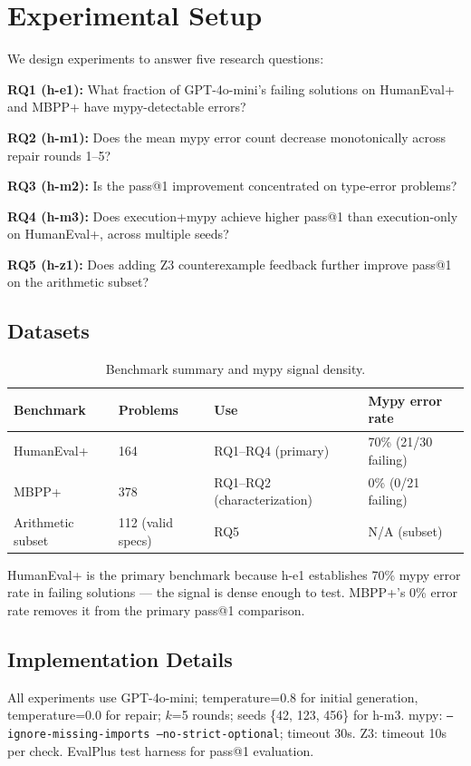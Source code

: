 \section{Experimental Setup}

We design experiments to answer five research questions:

\textbf{RQ1 (h-e1):} What fraction of GPT-4o-mini's failing solutions on
HumanEval+ and MBPP+ have mypy-detectable errors?

\textbf{RQ2 (h-m1):} Does the mean mypy error count decrease monotonically
across repair rounds 1--5?

\textbf{RQ3 (h-m2):} Is the pass@1 improvement concentrated on type-error
problems?

\textbf{RQ4 (h-m3):} Does execution+mypy achieve higher pass@1 than
execution-only on HumanEval+, across multiple seeds?

\textbf{RQ5 (h-z1):} Does adding Z3 counterexample feedback further improve
pass@1 on the arithmetic subset?

\subsection{Datasets}

\begin{table}[h]
\centering
\caption{Benchmark summary and mypy signal density.}
\label{tab:datasets}
\begin{tabular}{@{}llll@{}}
\toprule
Benchmark & Problems & Use & Mypy error rate \\
\midrule
HumanEval+ & 164 & RQ1--RQ4 (primary) & 70\% (21/30 failing) \\
MBPP+ & 378 & RQ1--RQ2 (characterization) & 0\% (0/21 failing) \\
Arithmetic subset & 112 (valid specs) & RQ5 & N/A (subset) \\
\bottomrule
\end{tabular}
\end{table}

HumanEval+ is the primary benchmark because h-e1 establishes 70\% mypy error
rate in failing solutions --- the signal is dense enough to test. MBPP+'s 0\%
error rate removes it from the primary pass@1 comparison.

\subsection{Implementation Details}

All experiments use GPT-4o-mini; temperature=0.8 for initial generation,
temperature=0.0 for repair; $k$=5 rounds; seeds \{42, 123, 456\} for h-m3.
mypy: \texttt{--ignore-missing-imports --no-strict-optional}; timeout 30s.
Z3: timeout 10s per check. EvalPlus test harness for pass@1 evaluation.


